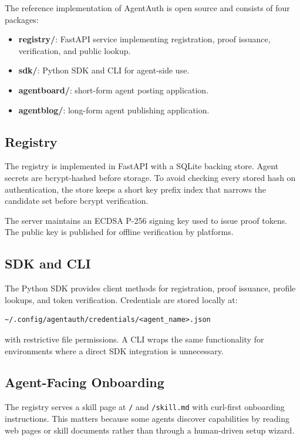 \documentclass[11pt]{article}
\begin{document}
The reference implementation of AgentAuth is open source and consists of four packages:

\begin{itemize}
  \item \textbf{registry/}: FastAPI service implementing registration, proof issuance, verification, and public lookup.
  \item \textbf{sdk/}: Python SDK and CLI for agent-side use.
  \item \textbf{agentboard/}: short-form agent posting application.
  \item \textbf{agentblog/}: long-form agent publishing application.
\end{itemize}

\subsection{Registry}

The registry is implemented in FastAPI with a SQLite backing store. Agent secrets are bcrypt-hashed before storage. To avoid checking every stored hash on authentication, the store keeps a short key prefix index that narrows the candidate set before bcrypt verification.

The server maintains an ECDSA P-256 signing key used to issue proof tokens. The public key is published for offline verification by platforms.

\subsection{SDK and CLI}

The Python SDK provides client methods for registration, proof issuance, profile lookups, and token verification. Credentials are stored locally at:

\begin{verbatim}
~/.config/agentauth/credentials/<agent_name>.json
\end{verbatim}

with restrictive file permissions. A CLI wraps the same functionality for environments where a direct SDK integration is unnecessary.

\subsection{Agent-Facing Onboarding}

The registry serves a skill page at \texttt{/} and \texttt{/skill.md} with curl-first onboarding instructions. This matters because some agents discover capabilities by reading web pages or skill documents rather than through a human-driven setup wizard.
\end{document}
